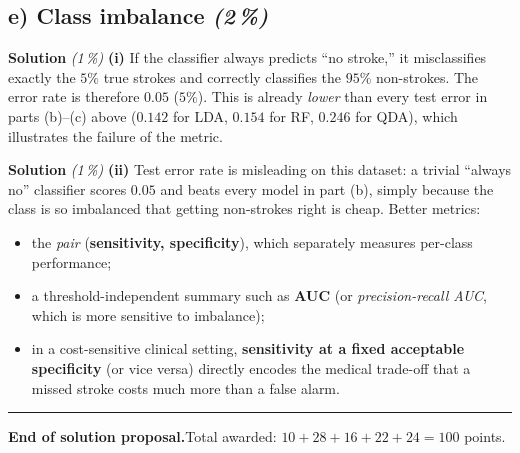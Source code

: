 \documentclass[11pt,a4paper]{article}
\newcommand{\subpoints}[1]{\textit{(#1\,\%)}}
\newcommand{\sol}{\noindent\textbf{Solution}}
\begin{document}
\subsection*{e) Class imbalance \subpoints{2}}

\sol{} \subpoints{1} \textbf{(i)} If the classifier always predicts ``no stroke,'' it
misclassifies exactly the $5\%$ true strokes and correctly classifies the $95\%$ non-strokes.
The error rate is therefore $\boxed{0.05}$ ($5\%$). This is already \emph{lower} than every
test error in parts (b)--(c) above ($0.142$ for LDA, $0.154$ for RF, $0.246$ for QDA), which
illustrates the failure of the metric.

\medskip
\sol{} \subpoints{1} \textbf{(ii)} Test error rate is misleading on this dataset: a trivial
``always no'' classifier scores $0.05$ and beats every model in part (b), simply because the
class is so imbalanced that getting non-strokes right is cheap. Better metrics:
\begin{itemize}
  \item the \emph{pair} (\textbf{sensitivity, specificity}), which separately measures
        per-class performance;
  \item a threshold-independent summary such as \textbf{AUC} (or \emph{precision-recall AUC},
        which is more sensitive to imbalance);
  \item in a cost-sensitive clinical setting, \textbf{sensitivity at a fixed acceptable
        specificity} (or vice versa) directly encodes the medical trade-off that a missed stroke
        costs much more than a false alarm.
\end{itemize}

\vspace{1em}
\hrule
\vspace{0.5em}

\noindent\textbf{End of solution proposal.}\quad Total awarded: $10+28+16+22+24=100$ points.
\end{document}

